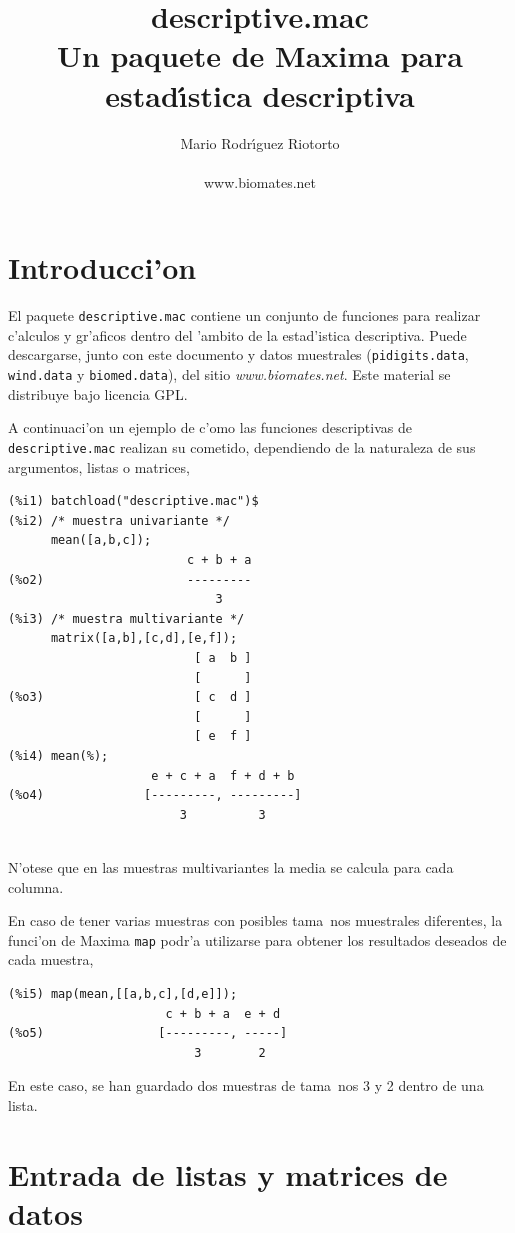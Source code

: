 \documentclass[spanish,12pt,a4paper]{article}
\title{\textbf{\Huge{descriptive.mac}\\
                       \large{Un paquete de Maxima para estad\'{\i}stica descriptiva}}}
\author{\Large{Mario Rodr\'{\i}guez Riotorto}\\
	  \\
	  www.biomates.net\\
	  }
\begin{document}
\maketitle
\tableofcontents

\section{Introducci'on}

El paquete \verb|descriptive.mac| contiene un conjunto de funciones para realizar c'alculos y gr'aficos dentro del 'ambito de la estad'istica descriptiva. Puede descargarse, junto con este documento y datos muestrales (\verb|pidigits.data|, \verb|wind.data| y \verb|biomed.data|), del sitio \emph{www.biomates.net}. Este material se distribuye bajo licencia GPL.

A continuaci'on un ejemplo de c'omo las funciones descriptivas de \verb|descriptive.mac| realizan su cometido, dependiendo de la naturaleza de sus argumentos, listas o matrices,
\begin{verbatim}
(%i1) batchload("descriptive.mac")$
(%i2) /* muestra univariante */
      mean([a,b,c]);
                         c + b + a
(%o2)                    ---------
                             3
(%i3) /* muestra multivariante */
      matrix([a,b],[c,d],[e,f]);
                          [ a  b ]
                          [      ]
(%o3)                     [ c  d ]
                          [      ]
                          [ e  f ]
(%i4) mean(%);
                    e + c + a  f + d + b
(%o4)              [---------, ---------]
                        3          3


\end{verbatim}
N'otese que en las muestras multivariantes la media se calcula para cada columna.

En caso de tener varias muestras con posibles tama~nos muestrales diferentes, la funci'on de Maxima \verb|map| podr'a utilizarse para obtener los resultados deseados de cada muestra,
\begin{verbatim}
(%i5) map(mean,[[a,b,c],[d,e]]);
                      c + b + a  e + d
(%o5)                [---------, -----]
                          3        2
\end{verbatim}
En este caso, se han guardado dos muestras de tama~nos 3 y 2 dentro de una lista.

\section{Entrada de listas y matrices de datos}
\end{document}
